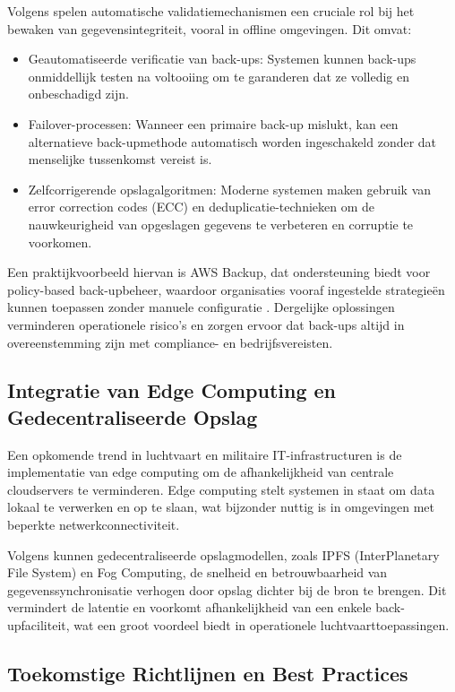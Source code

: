 Volgens \textcite{Abdelaziz48PP100_116} spelen automatische validatiemechanismen een cruciale rol bij het bewaken van gegevensintegriteit, vooral in offline omgevingen. Dit omvat:
\begin{itemize}
    \item Geautomatiseerde verificatie van back-ups: Systemen kunnen back-ups onmiddellijk testen na voltooiing om te garanderen dat ze volledig en onbeschadigd zijn.
    \item Failover-processen: Wanneer een primaire back-up mislukt, kan een alternatieve back-upmethode automatisch worden ingeschakeld zonder dat menselijke tussenkomst vereist is.
    \item Zelfcorrigerende opslagalgoritmen: Moderne systemen maken gebruik van error correction codes (ECC) en deduplicatie-technieken om de nauwkeurigheid van opgeslagen gegevens te verbeteren en corruptie te voorkomen.
\end{itemize}

Een praktijkvoorbeeld hiervan is AWS Backup, dat ondersteuning biedt voor policy-based back-upbeheer, waardoor organisaties vooraf ingestelde strategieën kunnen toepassen zonder manuele configuratie \autocite{AWSBackup}. Dergelijke oplossingen verminderen operationele risico's en zorgen ervoor dat back-ups altijd in overeenstemming zijn met compliance- en bedrijfsvereisten.

\subsection{Integratie van Edge Computing en Gedecentraliseerde Opslag}
\label{subsec:edge-computing}

Een opkomende trend in luchtvaart en militaire IT-infrastructuren is de implementatie van edge computing om de afhankelijkheid van centrale cloudservers te verminderen. Edge computing stelt systemen in staat om data lokaal te verwerken en op te slaan, wat bijzonder nuttig is in omgevingen met beperkte netwerkconnectiviteit.

Volgens \textcite{VinayakBhuvi} kunnen gedecentraliseerde opslagmodellen, zoals IPFS (InterPlanetary File System) en Fog Computing, de snelheid en betrouwbaarheid van gegevenssynchronisatie verhogen door opslag dichter bij de bron te brengen. Dit vermindert de latentie en voorkomt afhankelijkheid van een enkele back-upfaciliteit, wat een groot voordeel biedt in operationele luchtvaarttoepassingen.

\subsection{Toekomstige Richtlijnen en Best Practices}
\label{subsec:best-practices}

